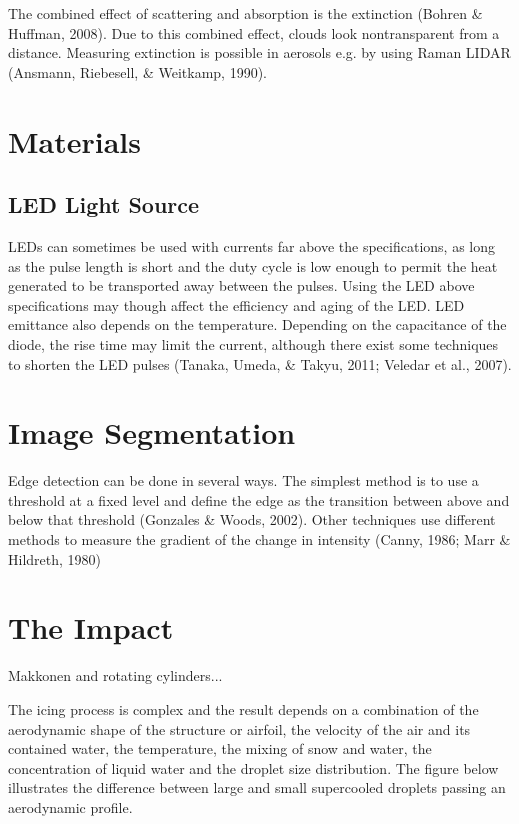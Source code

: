 The combined effect of scattering and absorption is the extinction (Bohren \& Huffman, 2008). Due to this combined effect, clouds look nontransparent from a distance. Measuring extinction is possible in aerosols e.g. by using Raman LIDAR (Ansmann, Riebesell, \& Weitkamp, 1990).

\section{Materials}
\subsection{LED Light Source}

LEDs can sometimes be used with currents far above the specifications, as long as the pulse length is short and the duty cycle is low enough to permit the heat generated to be transported away between the pulses. Using the LED above specifications may though affect the efficiency and aging of the LED. LED emittance also depends on the temperature. Depending on the capacitance of the diode, the rise time may limit the current, although there exist some techniques to shorten the LED pulses (Tanaka, Umeda, \& Takyu, 2011; Veledar et al., 2007).

\section{Image Segmentation}

Edge detection can be done in several ways. The simplest method is to use a threshold at a fixed level and define the edge as the transition between above and below that threshold (Gonzales \& Woods, 2002). Other techniques use different methods to measure the gradient of the change in intensity (Canny, 1986; Marr \& Hildreth, 1980)


\section{The Impact}

Makkonen and rotating cylinders...

The icing process is complex and the result depends on a combination of the aerodynamic shape of the structure or airfoil, the velocity of the air and its contained water, the temperature, the mixing of snow and water, the concentration of liquid water and the droplet size distribution. The figure below illustrates the difference between large and small supercooled droplets passing an aerodynamic profile.

